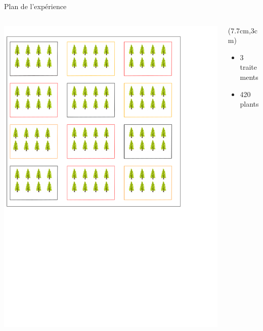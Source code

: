 \documentclass{beamer}
\begin{document}
\begin{frame}{Plan de l'expérience}
		\begin{columns}			
			\begin{column}{0.7\textwidth}
				\includegraphics[width=\textwidth]{Plan_experimentation}\\
			\end{column}
			\begin{column}{0.3\textwidth}
					\begin{textblock*}{10cm}(7.7cm,3cm)
				\begin{itemize} 
                	\item 3 traitements\\
                	\vspace{0.2cm}			
					\item 420 plants\\

\end{itemize}
\end{textblock*}
\end{column}
\end{columns}
\end{frame}
\end{document}
